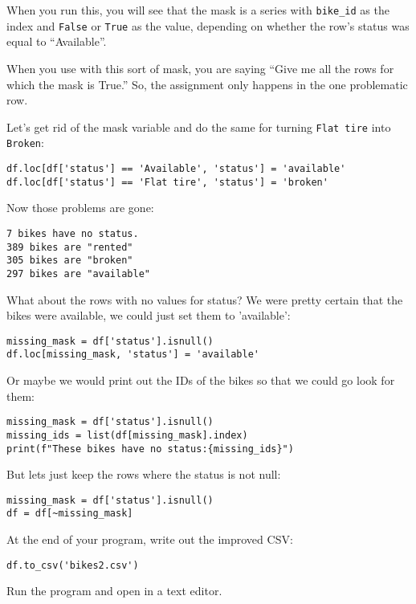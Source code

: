 When you run this, you will see that the mask is a series with
\texttt{bike\_id} as the index and \texttt{False} or \texttt{True} as the value,
depending on whether the row's status was equal to ``Available''.

When you use  with this sort of mask, you are saying
``Give me all the rows for which the mask is True.''  So, the
assignment only happens in the one problematic row.

Let's get rid of the mask variable and do the same for turning \texttt{Flat tire} into \texttt{Broken}:

\begin{Verbatim}
df.loc[df['status'] == 'Available', 'status'] = 'available'
df.loc[df['status'] == 'Flat tire', 'status'] = 'broken'
\end{Verbatim}

Now those problems are gone:
\begin{Verbatim}
7 bikes have no status.
389 bikes are "rented"
305 bikes are "broken"
297 bikes are "available"
\end{Verbatim}

What about the rows with no values for status? We were pretty certain
that the bikes were available, we could just set them to 'available':

\begin{Verbatim}
missing_mask = df['status'].isnull()
df.loc[missing_mask, 'status'] = 'available'
\end{Verbatim}

Or maybe we would print out the IDs of the bikes so that we could go look for them:

\begin{Verbatim}
missing_mask = df['status'].isnull()
missing_ids = list(df[missing_mask].index)
print(f"These bikes have no status:{missing_ids}")
\end{Verbatim}

But lets just keep the rows where the status is not null:
\begin{Verbatim}
missing_mask = df['status'].isnull()
df = df[~missing_mask]
\end{Verbatim}

At the end of your program, write out the improved CSV:

\begin{Verbatim}
df.to_csv('bikes2.csv')
\end{Verbatim}

Run the program and open  in a text editor.




